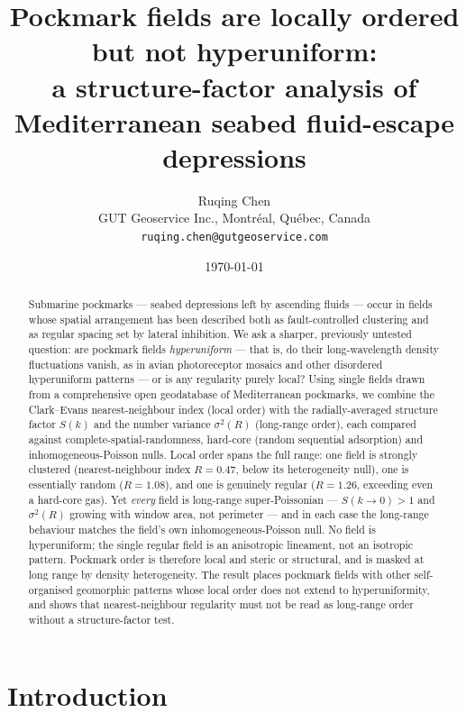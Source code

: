 \documentclass[11pt]{article}
\title{\bfseries Pockmark fields are locally ordered but not hyperuniform:\\
a structure-factor analysis of Mediterranean seabed fluid-escape depressions}
\author{Ruqing Chen\\[2pt]
\small GUT Geoservice Inc., Montr\'eal, Qu\'ebec, Canada\\
\small \texttt{ruqing.chen@gutgeoservice.com}}
\date{\today}
\begin{document}
\maketitle

\begin{abstract}
\noindent
Submarine pockmarks --- seabed depressions left by ascending fluids --- occur in
fields whose spatial arrangement has been described both as fault-controlled
clustering and as regular spacing set by lateral inhibition. We ask a sharper,
previously untested question: are pockmark fields \emph{hyperuniform} --- that
is, do their long-wavelength density fluctuations vanish, as in avian
photoreceptor mosaics and other disordered hyperuniform patterns --- or is any
regularity purely local? Using single fields drawn from a comprehensive open
geodatabase of Mediterranean pockmarks, we combine the Clark--Evans
nearest-neighbour index (local order) with the radially-averaged structure
factor $S(k)$ and the number variance $\sigma^2(R)$ (long-range order), each
compared against complete-spatial-randomness, hard-core (random sequential
adsorption) and inhomogeneous-Poisson nulls. Local order spans the full range:
one field is strongly clustered (nearest-neighbour index $R=0.47$, below its
heterogeneity null), one is essentially random ($R=1.08$), and one is genuinely
regular ($R=1.26$, exceeding even a hard-core gas). Yet \emph{every} field is
long-range super-Poissonian --- $S(k\!\to\!0)>1$ and $\sigma^2(R)$ growing with
window area, not perimeter --- and in each case the long-range behaviour matches
the field's own inhomogeneous-Poisson null. No field is hyperuniform; the single
regular field is an anisotropic lineament, not an isotropic pattern. Pockmark
order is therefore local and steric or structural, and is masked at long range
by density heterogeneity. The result places pockmark fields with other
self-organised geomorphic patterns whose local order does not extend to
hyperuniformity, and shows that nearest-neighbour regularity must not be read as
long-range order without a structure-factor test.
\end{abstract}

\section{Introduction}
\end{document}
